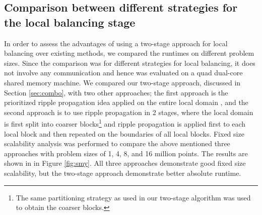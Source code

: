 \subsection{Comparison between different strategies for the local balancing stage}
\label{sec:ccr}
In order to assess the advantages of using a two-stage approach for local
balancing over existing methods, we compared the runtimes on different problem
sizes. Since the comparison was for different strategies for local balancing,
it does not involve any communication and hence was evaluated on a quad
dual-core shared memory machine. We compared our two-stage approach, discussed
in Section \ref{sec:combo}, with two other approaches; the first approach is the prioritized ripple propagation idea applied on the
entire local domain \cite{tu05}, and the second approach is to use ripple
propagation in 2 stages, where the local domain is first split into coarser
blocks\footnote{The same partitioning strategy as used in our two-stage
algorithm was used to obtain the coarser blocks.} and ripple propagation is
applied first to each local block and then repeated on the boundaries of all
local blocks. Fixed size scalability analysis was performed to compare the
above mentioned three approaches with problem sizes of 1, 4, 8, and 16 million
points. The results are shown in in Figure \ref{fig:smy}. All three approaches
demonstrate good fixed size scalability, but the two-stage approach demonstrate
better absolute runtime.


